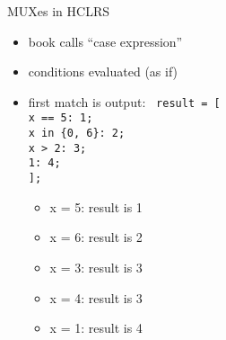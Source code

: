 \begin{frame}{MUXes in HCLRS}
\begin{itemize}
\item book calls ``case expression''
\item conditions evaluated (as if) 
\item first match is output:
{\tt\small
result = [ \\
\hspace{.5cm} x == 5: 1; \\
\hspace{.5cm} x in \{0, 6\}: 2; \\
\hspace{.5cm} x > 2: 3; \\
\hspace{.5cm} 1: 4; \\
]; \\
}
    \begin{itemize}
    \item x = 5: result is 1
    \item x = 6: result is 2
    \item x = 3: result is 3
    \item x = 4: result is 3
    \item x = 1: result is 4
    \end{itemize}
\end{itemize}
\end{frame}
